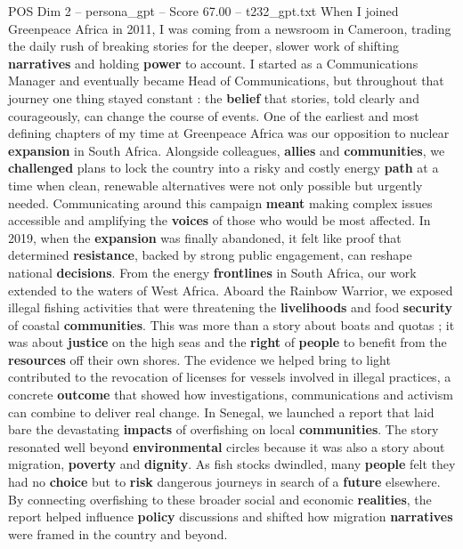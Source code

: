 \begin{textsample}{POS Dim 2 – persona\_gpt – Score 67.00 – t232\_gpt.txt}  \label{ex:f2_pos_003}
When I joined Greenpeace Africa in 2011, I was coming from a newsroom in Cameroon, trading the daily rush of breaking stories for the deeper, slower work of shifting \textbf{narratives} and holding \textbf{power} to account.
I started as a Communications Manager and eventually became Head of Communications, but throughout that journey one thing stayed constant : the \textbf{belief} that stories, told clearly and courageously, can change the course of events.
One of the earliest and most defining chapters of my time at Greenpeace Africa was our opposition to nuclear \textbf{expansion} in South Africa.
Alongside colleagues, \textbf{allies} and \textbf{communities}, we \textbf{challenged} plans to lock the country into a risky and costly energy \textbf{path} at a time when clean, renewable alternatives were not only possible but urgently needed.
Communicating around this campaign \textbf{meant} making complex issues accessible and amplifying the \textbf{voices} of those who would be most affected.
In 2019, when the \textbf{expansion} was finally abandoned, it felt like proof that determined \textbf{resistance}, backed by strong public engagement, can reshape national \textbf{decisions}.
From the energy \textbf{frontlines} in South Africa, our work extended to the waters of West Africa.
Aboard the Rainbow Warrior, we exposed illegal fishing activities that were threatening the \textbf{livelihoods} and food \textbf{security} of coastal \textbf{communities}.
This was more than a story about boats and quotas ; it was about \textbf{justice} on the high seas and the \textbf{right} of \textbf{people} to benefit from the \textbf{resources} off their own shores.
The evidence we helped bring to light contributed to the revocation of licenses for vessels involved in illegal practices, a concrete \textbf{outcome} that showed how investigations, communications and activism can combine to deliver real change.
In Senegal, we launched a report that laid bare the devastating \textbf{impacts} of overfishing on local \textbf{communities}.
The story resonated well beyond \textbf{environmental} circles because it was also a story about migration, \textbf{poverty} and \textbf{dignity}.
As fish stocks dwindled, many \textbf{people} felt they had no \textbf{choice} but to \textbf{risk} dangerous journeys in search of a \textbf{future} elsewhere.
By connecting overfishing to these broader social and economic \textbf{realities}, the report helped influence \textbf{policy} discussions and shifted how migration \textbf{narratives} were framed in the country and beyond.

\end{textsample}
